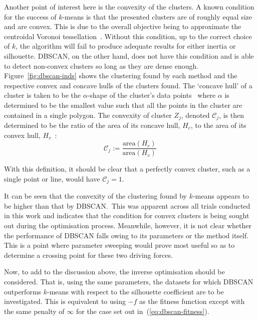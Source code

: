 Another point of interest here is the convexity of the clusters. A known
condition for the success of \(k\)-means is that the presented clusters are of
roughly equal size and are convex. This is due to the overall objective being to
approximate the centroidal Voronoi tessellation~\cite{Du2006}. Without this
condition, up to the correct choice of \(k\), the algorithm will fail to produce
adequate results for either inertia or silhouette. DBSCAN, on the other hand,
does not have this condition and is able to detect non-convex clusters so long
as they are dense enough. Figure~\ref{fig:dbscan-inds} shows the clustering
found by each method and the respective convex and concave hulls of the clusters
found. The `concave hull' of a cluster is taken to be the \(\alpha\)-shape of
the cluster's data points~\cite{Edelsbrunner1983} where \(\alpha\) is determined
to be the smallest value such that all the points in the cluster are contained
in a single polygon. The convexity of cluster \(Z_j\), denoted
\(\mathcal{C}_j\), is then determined to be the ratio of the area of its concave
hull, \(H_c\), to the area of its convex hull, \(H_v\)~\cite{Sonka1993}:
\begin{equation}
    \mathcal{C}_j :=
    \frac{\text{area}\left(H_c\right)}{\text{area}\left(H_v\right)}
\end{equation}

With this definition, it should be clear that a perfectly convex cluster, such
as a single point or line, would have \(\mathcal{C}_j = 1\).

It can be seen that the convexity of the clustering found by \(k\)-means appears
to be higher than that by DBSCAN.\ This was apparent across all trials conducted
in this work and indicates that the condition for convex clusters is being
sought out during the optimisation process. Meanwhile, however, it is not clear
whether the performance of DBSCAN falls owing to its parameters or the method
itself. This is a point where parameter sweeping would prove most useful so as
to determine a crossing point for these two driving forces.

Now, to add to the discussion above, the inverse optimisation should be
considered. That is, using the same parameters, the datasets for which DBSCAN
outperforms \(k\)-means with respect to the silhouette coefficient are to be
investigated. This is equivalent to using \(-f\) as the fitness function
except with the same penalty of \(\infty\) for the case set out
in~(\ref{eq:dbscan-fitness}).


